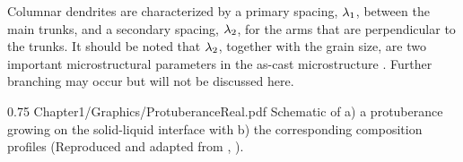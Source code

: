 Columnar dendrites are characterized by a primary spacing, ${\lambda}_{1}$, between the main trunks, and a secondary spacing, ${\lambda}_{2}$, for the arms that are perpendicular
to the trunks. It should be noted that ${\lambda}_{2}$, together with the grain size, are two important microstructural parameters in the as-cast microstructure \citep{easton_grain_2011}.
Further branching may occur but will not be discussed here.
\begin{figureth}
{0.75}
{Chapter1/Graphics/ProtuberanceReal.pdf} %
{Schematic of a) a protuberance growing on the solid-liquid interface with b) the corresponding composition profiles 
(Reproduced and adapted from \citet{doitpoms_dissemination_2000}, \doitpoms).}
\label{fig:dendritic_growth}
\end{figureth}
